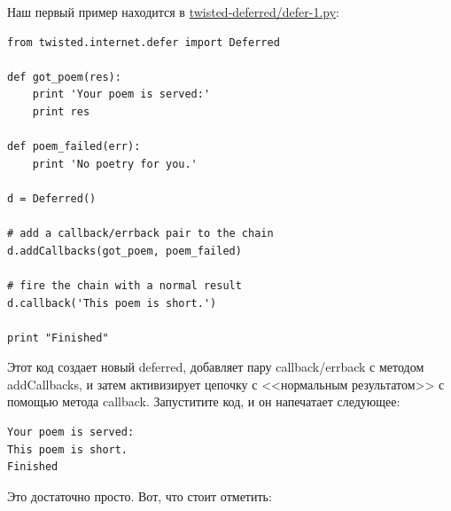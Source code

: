 Наш первый пример находится в 
\href{http://github.com/jdavisp3/twisted-intro/blob/master/twisted-deferred/defer-1.py}{twisted-deferred/defer-1.py}:

\begin{scriptsize}\begin{verbatim}
from twisted.internet.defer import Deferred

def got_poem(res):
    print 'Your poem is served:'
    print res

def poem_failed(err):
    print 'No poetry for you.'

d = Deferred()

# add a callback/errback pair to the chain
d.addCallbacks(got_poem, poem_failed)

# fire the chain with a normal result
d.callback('This poem is short.')

print "Finished"
\end{verbatim}\end{scriptsize}


Этот код создает новый deferred, добавляет пару callback/errback с 
методом addCallbacks, и затем активизирует цепочку с <<нормальным результатом>> 
с помощью метода callback. Запуститите код, и он напечатает следующее:

\begin{scriptsize}\begin{verbatim}
Your poem is served:
This poem is short.
Finished
\end{verbatim}\end{scriptsize}

Это достаточно просто. Вот, что стоит отметить:

